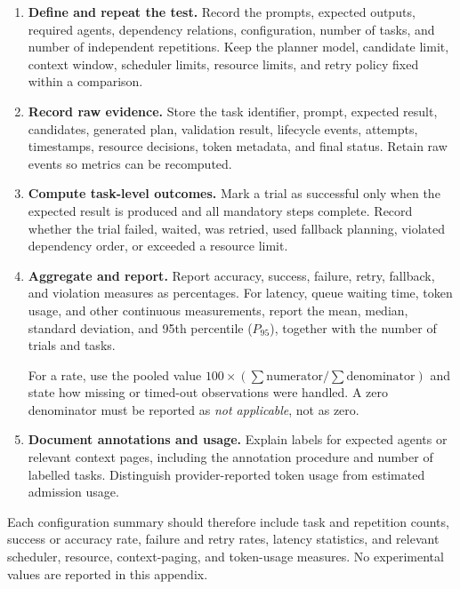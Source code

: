 \begin{enumerate}
\item \textbf{Define and repeat the test.} Record the prompts, expected outputs, required agents, dependency relations, configuration, number of tasks, and number of independent repetitions. Keep the planner model, candidate limit, context window, scheduler limits, resource limits, and retry policy fixed within a comparison.

\item \textbf{Record raw evidence.} Store the task identifier, prompt, expected result, candidates, generated plan, validation result, lifecycle events, attempts, timestamps, resource decisions, token metadata, and final status. Retain raw events so metrics can be recomputed.

\item \textbf{Compute task-level outcomes.} Mark a trial as successful only when the expected result is produced and all mandatory steps complete. Record whether the trial failed, waited, was retried, used fallback planning, violated dependency order, or exceeded a resource limit.

\item \textbf{Aggregate and report.} Report accuracy, success, failure, retry, fallback, and violation measures as percentages. For latency, queue waiting time, token usage, and other continuous measurements, report the mean, median, standard deviation, and 95th percentile ($P_{95}$), together with the number of trials and tasks.

For a rate, use the pooled value $100\times(\sum\text{numerator}/\sum\text{denominator})$ and state how missing or timed-out observations were handled. A zero denominator must be reported as \textit{not applicable}, not as zero.

\item \textbf{Document annotations and usage.} Explain labels for expected agents or relevant context pages, including the annotation procedure and number of labelled tasks. Distinguish provider-reported token usage from estimated admission usage.
\end{enumerate}

Each configuration summary should therefore include task and repetition counts, success or accuracy rate, failure and retry rates, latency statistics, and relevant scheduler, resource, context-paging, and token-usage measures. No experimental values are reported in this appendix.
